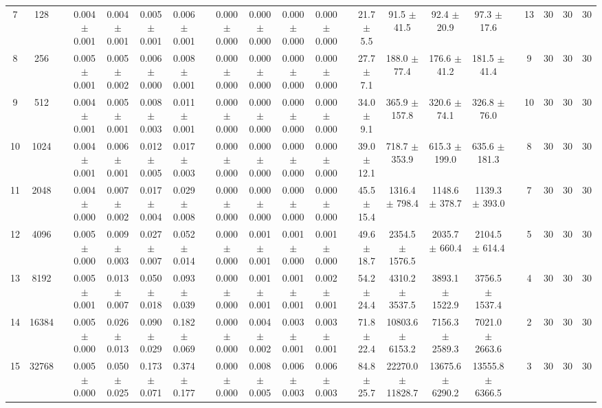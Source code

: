 \documentclass[11pt]{article}
\begin{document}
\begin{landscape}
\begin{table}
\begin{tabular}{cccccccccccccccccccccc}
 7 &     128 &&  0.004 $\pm$ 0.001 & 0.004 $\pm$ 0.001 & 0.005 $\pm$ 0.001 & 0.006 $\pm$ 0.001 &&  0.000 $\pm$ 0.000 & 0.000 $\pm$ 0.000 & 0.000 $\pm$ 0.000 & 0.000 $\pm$ 0.000 &&  21.7 $\pm$  5.5 & 91.5 $\pm$ 41.5 & 92.4 $\pm$ 20.9 & 97.3 $\pm$ 17.6 && 13& 30& 30& 30\\
 8 &     256 &&  0.005 $\pm$ 0.001 & 0.005 $\pm$ 0.002 & 0.006 $\pm$ 0.000 & 0.008 $\pm$ 0.001 &&  0.000 $\pm$ 0.000 & 0.000 $\pm$ 0.000 & 0.000 $\pm$ 0.000 & 0.000 $\pm$ 0.000 &&  27.7 $\pm$  7.1 & 188.0 $\pm$ 77.4 & 176.6 $\pm$ 41.2 & 181.5 $\pm$ 41.4 && 9& 30& 30& 30\\
 9 &     512 &&  0.004 $\pm$ 0.001 & 0.005 $\pm$ 0.001 & 0.008 $\pm$ 0.003 & 0.011 $\pm$ 0.001 &&  0.000 $\pm$ 0.000 & 0.000 $\pm$ 0.000 & 0.000 $\pm$ 0.000 & 0.000 $\pm$ 0.000 &&  34.0 $\pm$  9.1 & 365.9 $\pm$ 157.8 & 320.6 $\pm$ 74.1 & 326.8 $\pm$ 76.0 && 10& 30& 30& 30\\
10 &    1024 &&  0.004 $\pm$ 0.001 & 0.006 $\pm$ 0.001 & 0.012 $\pm$ 0.005 & 0.017 $\pm$ 0.003 &&  0.000 $\pm$ 0.000 & 0.000 $\pm$ 0.000 & 0.000 $\pm$ 0.000 & 0.000 $\pm$ 0.000 &&  39.0 $\pm$ 12.1 & 718.7 $\pm$ 353.9 & 615.3 $\pm$ 199.0 & 635.6 $\pm$ 181.3 && 8& 30& 30& 30\\
11 &    2048 &&  0.004 $\pm$ 0.000 & 0.007 $\pm$ 0.002 & 0.017 $\pm$ 0.004 & 0.029 $\pm$ 0.008 &&  0.000 $\pm$ 0.000 & 0.000 $\pm$ 0.000 & 0.000 $\pm$ 0.000 & 0.000 $\pm$ 0.000 &&  45.5 $\pm$ 15.4 & 1316.4 $\pm$ 798.4 & 1148.6 $\pm$ 378.7 & 1139.3 $\pm$ 393.0 && 7& 30& 30& 30\\
12 &    4096 &&  0.005 $\pm$ 0.000 & 0.009 $\pm$ 0.003 & 0.027 $\pm$ 0.007 & 0.052 $\pm$ 0.014 &&  0.000 $\pm$ 0.000 & 0.001 $\pm$ 0.001 & 0.001 $\pm$ 0.000 & 0.001 $\pm$ 0.000 &&  49.6 $\pm$ 18.7 & 2354.5 $\pm$ 1576.5 & 2035.7 $\pm$ 660.4 & 2104.5 $\pm$ 614.4 && 5& 30& 30& 30\\
13 &    8192 &&  0.005 $\pm$ 0.001 & 0.013 $\pm$ 0.007 & 0.050 $\pm$ 0.018 & 0.093 $\pm$ 0.039 &&  0.000 $\pm$ 0.000 & 0.001 $\pm$ 0.001 & 0.001 $\pm$ 0.001 & 0.002 $\pm$ 0.001 &&  54.2 $\pm$ 24.4 & 4310.2 $\pm$ 3537.5 & 3893.1 $\pm$ 1522.9 & 3756.5 $\pm$ 1537.4 && 4& 30& 30& 30\\
14 &   16384 &&  0.005 $\pm$ 0.000 & 0.026 $\pm$ 0.013 & 0.090 $\pm$ 0.029 & 0.182 $\pm$ 0.069 &&  0.000 $\pm$ 0.000 & 0.004 $\pm$ 0.002 & 0.003 $\pm$ 0.001 & 0.003 $\pm$ 0.001 &&  71.8 $\pm$ 22.4 & 10803.6 $\pm$ 6153.2 & 7156.3 $\pm$ 2589.3 & 7021.0 $\pm$ 2663.6 && 2& 30& 30& 30\\
15 &   32768 &&  0.005 $\pm$ 0.000 & 0.050 $\pm$ 0.025 & 0.173 $\pm$ 0.071 & 0.374 $\pm$ 0.177 &&  0.000 $\pm$ 0.000 & 0.008 $\pm$ 0.005 & 0.006 $\pm$ 0.003 & 0.006 $\pm$ 0.003 &&  84.8 $\pm$ 25.7 & 22270.0 $\pm$ 11828.7 & 13675.6 $\pm$ 6290.2 & 13555.8 $\pm$ 6366.5 && 3& 30& 30& 30\\

\end{tabular}
\end{table}
\end{landscape}
\end{document}
